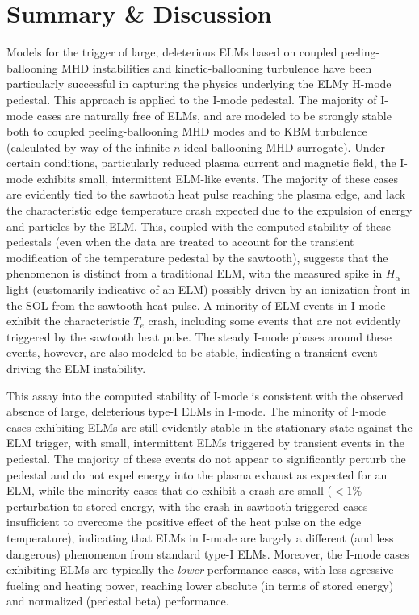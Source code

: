 \section{Summary \& Discussion}\label{sec:imode_mod_conclusions}

Models for the trigger of large, deleterious ELMs based on coupled peeling-ballooning MHD instabilities \cite{Wilson2002,Snyder2003,Snyder2004,Wilson2006} and kinetic-ballooning turbulence \cite{Snyder1999,Candy2005,Snyder2001} have been particularly successful in capturing the physics underlying the ELMy H-mode pedestal.  This approach is applied to the I-mode pedestal.  The majority of I-mode cases are naturally free of ELMs, and are modeled to be strongly stable both to coupled peeling-ballooning MHD modes and to KBM turbulence (calculated by way of the infinite-$n$ ideal-ballooning MHD surrogate).  Under certain conditions, particularly reduced plasma current and magnetic field, the I-mode exhibits small, intermittent ELM-like events.  The majority of these cases are evidently tied to the sawtooth heat pulse reaching the plasma edge, and lack the characteristic edge temperature crash expected due to the expulsion of energy and particles by the ELM.  This, coupled with the computed stability of these pedestals (even when the data are treated to account for the transient modification of the temperature pedestal by the sawtooth), suggests that the phenomenon is distinct from a traditional ELM, with the measured spike in $H_\alpha$ light (customarily indicative of an ELM) possibly driven by an ionization front in the SOL from the sawtooth heat pulse.  A minority of ELM events in I-mode exhibit the characteristic $T_e$ crash, including some events that are not evidently triggered by the sawtooth heat pulse.  The steady I-mode phases around these events, however, are also modeled to be stable, indicating a transient event driving the ELM instability.

This assay into the computed stability of I-mode is consistent with the observed absence of large, deleterious type-I ELMs in I-mode.  The minority of I-mode cases exhibiting ELMs are still evidently stable in the stationary state against the ELM trigger, with small, intermittent ELMs triggered by transient events in the pedestal.  The majority of these events do not appear to significantly perturb the pedestal and do not expel energy into the plasma exhaust as expected for an ELM, while the minority cases that do exhibit a crash are small ($< 1\%$ perturbation to stored energy, with the crash in sawtooth-triggered cases insufficient to overcome the positive effect of the heat pulse on the edge temperature), indicating that ELMs in I-mode are largely a different (and less dangerous) phenomenon from standard type-I ELMs.  Moreover, the I-mode cases exhibiting ELMs are typically the \emph{lower} performance cases, with less agressive fueling and heating power, reaching lower absolute (in terms of stored energy) and normalized (pedestal beta) performance.  

